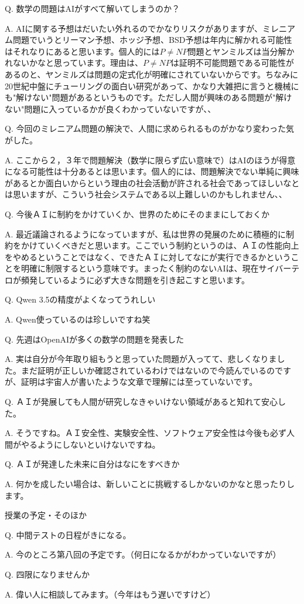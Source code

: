 \documentclass[a4paper,10pt,pdflatex,ja=standard,jafont=ipaex-type1,
  magstyle=real,scale=1]{bxjsarticle}
\newcommand{\topic}[1]{\par\vspace{5pt}%
  {\large\sffamily\mdseries\color{accent}#1}\par\vspace{2pt}}
\newcommand{\feedback}[2]{%
  \par\addvspace{5pt}\noindent\begin{minipage}{\linewidth}%
  {\color{ink}Q. #1}\par\vspace{1pt}%
  {\color{accent}A. }#2%
  \end{minipage}\par}
\begin{document}
\feedback{数学の問題はAIがすべて解いてしまうのか？}{%
AIに関する予想はだいたい外れるのでかなりリスクがありますが、ミレニアム問題でいうとリーマン予想、ホッジ予想、BSD予想は年内に解かれる可能性はそれなりにあると思います。個人的には$P\neq NP$問題とヤンミルズは当分解かれないかなと思っています。理由は、$P\neq NP$は証明不可能問題である可能性があるのと、ヤンミルズは問題の定式化が明確にされていないからです。ちなみに20世紀中盤にチューリングの面白い研究があって、かなり大雑把に言うと機械にも"解けない"問題があるというものです。ただし人間が興味のある問題が"解けない"問題に入っているかが良くわかっていないですが、、}

\feedback{今回のミレニアム問題の解決で、人間に求められるものがかなり変わった気がした。}{%
ここから２，３年で問題解決（数学に限らず広い意味で）はAIのほうが得意になる可能性は十分あるとは思います。個人的には、問題解決でない単純に興味があるとか面白いからという理由の社会活動が許される社会であってほしいなとは思いますが、こういう社会システムである以上難しいのかもしれません、、}

\feedback{今後ＡＩに制約をかけていくか、世界のためにそのままにしておくか}{%
最近議論されるようになっていますが、私は世界の発展のために積極的に制約をかけていくべきだと思います。ここでいう制約というのは、ＡＩの性能向上をやめるということではなく、できたＡＩに対してなにが実行できるかということを明確に制限するという意味です。まったく制約のないAIは、現在サイバーテロが頻発しているように必ず大きな問題を引き起こすと思います。}

\feedback{Qwen 3.5の精度がよくなってうれしい}{%
Qwen使っているのは珍しいですね笑}

\feedback{先週はOpenAIが多くの数学の問題を発表した}{%
実は自分が今年取り組もうと思っていた問題が入ってて、悲しくなりました。まだ証明が正しいか確認されているわけではないので今読んでいるのですが、証明は宇宙人が書いたような文章で理解には至っていないです。}

\feedback{ＡＩが発展しても人間が研究しなきゃいけない領域があると知れて安心した。}{%
そうですね。ＡＩ安全性、実験安全性、ソフトウェア安全性は今後も必ず人間がやるようにしないといけないですね。}

\feedback{ＡＩが発達した未来に自分はなにをすべきか}{%
何かを成したい場合は、新しいことに挑戦するしかないのかなと思ったりします。}

\topic{授業の予定・そのほか}
\feedback{中間テストの日程がきになる。}{%
今のところ第八回の予定です。（何日になるかがわかっていないですが）}

\feedback{四限になりませんか}{%
偉い人に相談してみます。（今年はもう遅いですけど）}
\end{document}
